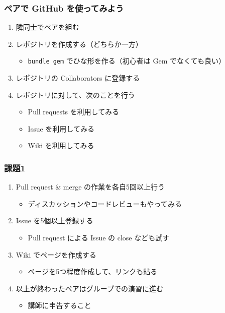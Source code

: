\documentclass[a4paper,twoside,twocolumn]{bxjsarticle}
\begin{document}
\subsubsection{ペアで GitHub を使ってみよう}
\label{sec-3-1-1}
\begin{enumerate}
\item 隣同士でペアを組む
\item レポジトリを作成する（どちらか一方）
\begin{itemize}
\item \texttt{bundle gem} でひな形を作る（初心者は Gem でなくても良い）
\end{itemize}
\item レポジトリの Collaborators に登録する
\item レポジトリに対して、次のことを行う
\begin{itemize}
\item Pull requests を利用してみる
\item Issue を利用してみる
\item Wiki を利用してみる
\end{itemize}
\end{enumerate}
\subsubsection{課題1}
\label{sec-3-1-2}
\begin{enumerate}
\item Pull request \& merge の作業を各自5回以上行う
\begin{itemize}
\item ディスカッションやコードレビューもやってみる
\end{itemize}
\item Issue を5個以上登録する
\begin{itemize}
\item Pull request による Issue の close なども試す
\end{itemize}
\item Wiki でページを作成する
\begin{itemize}
\item ページを5つ程度作成して、リンクも貼る
\end{itemize}
\item 以上が終わったペアはグループでの演習に進む
\begin{itemize}
\item 講師に申告すること
\end{itemize}
\end{enumerate}
\end{document}
